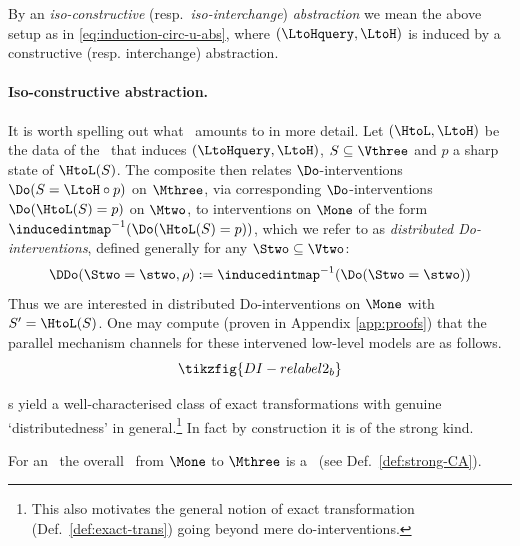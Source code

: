 \documentclass{article}
\begin{document}
\begin{definition} \label{def:iso-CCA} %
	By an \emph{iso-constructive} (resp.~\emph{iso-interchange}) \emph{abstraction} we mean the above setup as in \eqref{eq:induction-circ-u-abs}, where $(\LtoHquery,\LtoH)$ is induced by a constructive (resp. interchange) abstraction.  
\end{definition}

 
\paragraph{Iso-constructive abstraction.}
It is worth spelling out what \isoCCA\ amounts to in more detail. 
Let $(\HtoL, \LtoH)$ be the data of the \CCA\ that induces $(\LtoHquery,\LtoH)$, $S \subseteq \Vthree$ and $p$ a sharp state of $\HtoL(S)$.  
The composite \qup{} then relates $\Do$-interventions $\Do(S = \LtoH \circ p)$ on $\Mthree$, 
via corresponding $\Do$-interventions $\Do(\HtoL(S)=p)$ on $\Mtwo$, 
to interventions on $\Mone$ of the form  $\inducedintmap^{-1}(\Do(\HtoL(S)=p))$, which we refer to as \emph{distributed Do-interventions}, defined generally for any $\Stwo \subseteq \Vtwo$: 
\[
	\DDo(\Stwo=\stwo,\rho) := \inducedintmap^{-1}(\Do(\Stwo=\stwo)) 
\] 
Thus we are interested in distributed Do-interventions on $\Mone$ with $S'=\HtoL(S)$. One may compute (proven in Appendix \ref{app:proofs}) that the parallel mechanism channels for these intervened low-level models are as follows. 
\begin{equation} \label{eq:DDo-pic}
\tikzfig{DI-relabel2_b}
\end{equation}

\isoCCAcaps s yield a well-characterised class of exact transformations with genuine `distributedness' in general.\footnote{This also motivates the general notion of exact transformation (Def.~\ref{def:exact-trans}) going beyond mere do-interventions.}
In fact by construction it is of the strong kind. 
\begin{proposition}\label{prop:isoCCA-is-strongCA}
	For an \isoCCA\ the overall \qup{} \rlb{$(\LtoH \circ \modin, \LtoHquery \circ \inducedintmap)$}\ from $\Mone$ to $\Mthree$ is a \strongCA\ (see Def.~\ref{def:strong-CA}).   
\end{proposition}
\end{document}
